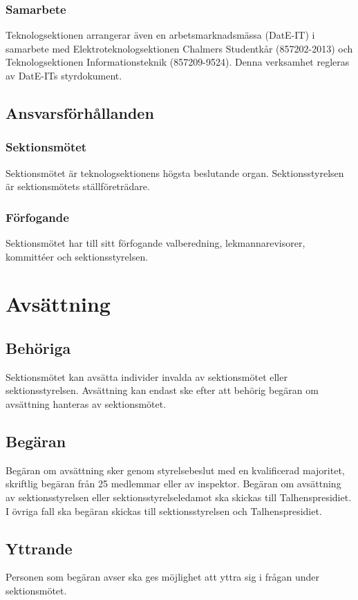 \documentclass[a4paper]{dtek}
\begin{document}
\subsubsection{Samarbete}
Teknologsektionen arrangerar även en arbetsmarknadsmässa (DatE-IT) i samarbete med Elektroteknologsektionen Chalmers Studentkår (857202-2013) och Teknologsektionen Informationsteknik (857209-9524). Denna verksamhet regleras av DatE-ITs styrdokument. 
  
\subsection{Ansvarsförhållanden}
\subsubsection{Sektionsmötet}
Sektionsmötet är teknologsektionens högsta beslutande organ. Sektionsstyrelsen är sektionsmötets ställföreträdare.
\subsubsection{Förfogande}
Sektionsmötet har till sitt förfogande valberedning, lekmannarevisorer, kommittéer och sektionsstyrelsen.
\newpage


\section{Avsättning}
\subsection{Behöriga}
Sektionsmötet kan avsätta individer invalda av sektionsmötet eller sektionsstyrelsen.
Avsättning kan endast ske efter att behörig begäran om avsättning hanteras av sektionsmötet.
\subsection{Begäran}
Begäran om avsättning sker genom styrelsebeslut med en kvalificerad majoritet, skriftlig begäran från 25 medlemmar eller av inspektor.
Begäran om avsättning av sektionsstyrelsen eller sektionsstyrelseledamot ska skickas till Talhenspresidiet.
I övriga fall ska begäran skickas till sektionsstyrelsen och Talhenspresidiet.
\subsection{Yttrande}
Personen som begäran avser ska ges möjlighet att yttra sig i frågan under sektionsmötet.
\end{document}
